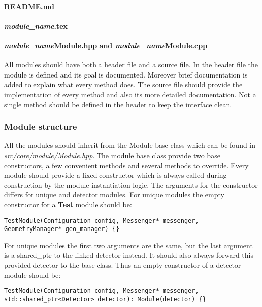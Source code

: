 \paragraph{README.md}
\todo

\paragraph{\textit{module\_name}.tex}
\todo

\paragraph{\textit{module\_name}Module.hpp and \textit{module\_name}Module.cpp}
All modules should have both a header file and a source file. In the header file the module is defined and its goal is documented. Moreover brief documentation is added to explain what every method does. The source file should provide the implementation of every method and also its more detailed documentation. Not a single method should be defined in the header to keep the interface clean.

\subsubsection{Module structure}
All the modules should inherit from the Module base class which can be found in \textit{src/core/module/Module.hpp}. The module base class provide two base constructors, a few convenient methods and several methods to override. Every module should provide a fixed constructor which is always called during construction by the module instantiation logic. The arguments for the constructor differs for unique and detector modules. For unique modules the empty constructor for a \textbf{Test} module should be:
\begin{verbatim}
TestModule(Configuration config, Messenger* messenger, GeometryManager* geo_manager) {}
\end{verbatim}

For unique modules the first two arguments are the same, but the last argument is a shared\_ptr to the linked detector instead. It should also always forward this provided detector to the base class. Thus an empty constructor of a detector module should be:
\begin{verbatim}
TestModule(Configuration config, Messenger* messenger, std::shared_ptr<Detector> detector): Module(detector) {}
\end{verbatim}

